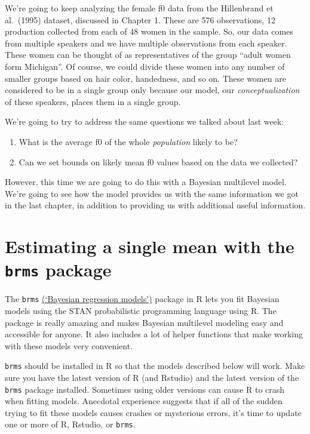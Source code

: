 \documentclass[
]{book}
\begin{document}
We're going to keep analyzing the female f0 data from the Hillenbrand et al.~(1995) dataset, discussed in Chapter 1. These are 576 observations, 12 production collected from each of 48 women in the sample. So, our data comes from multiple speakers and we have multiple observations from each speaker. These women can be thought of as representatives of the group ``adult women form Michigan''. Of course, we could divide these women into any number of smaller groups based on hair color, handedness, and so on. These women are considered to be in a single group only because our model, our \emph{conceptualization} of these speakers, places them in a single group.

We're going to try to address the same questions we talked about last week:

\begin{enumerate}
\def\labelenumi{\arabic{enumi})}
\item
  What is the average f0 of the whole \emph{population} likely to be?
\item
  Can we set bounds on likely mean f0 values based on the data we collected?
\end{enumerate}

However, this time we are going to do this with a Bayesian multilevel model. We're going to see how the model provides us with the same information we got in the last chapter, in addition to providing us with additional useful information.

\hypertarget{estimating-a-single-mean-with-the-brms-package}{%
\section{\texorpdfstring{Estimating a single mean with the \texttt{brms} package}{Estimating a single mean with the brms package}}\label{estimating-a-single-mean-with-the-brms-package}}

The \texttt{brms} \href{https://github.com/paul-buerkner/brms}{(`Bayesian regression models')} package in R lets you fit Bayesian models using the STAN probabilistic programming language using R. The package is really amazing and makes Bayesian multilevel modeling easy and accessible for anyone. It also includes a lot of helper functions that make working with these models very convenient.

\texttt{brms} should be installed in R so that the models described below will work. Make sure you have the latest version of R (and Rstudio) and the latest version of the \texttt{brms} package installed. Sometimes using older versions can cause R to crash when fitting models. Anecdotal experience suggests that if all of the sudden trying to fit these models causes crashes or mysterious errors, it's time to update one or more of R, Rstudio, or \texttt{brms}.
\end{document}
